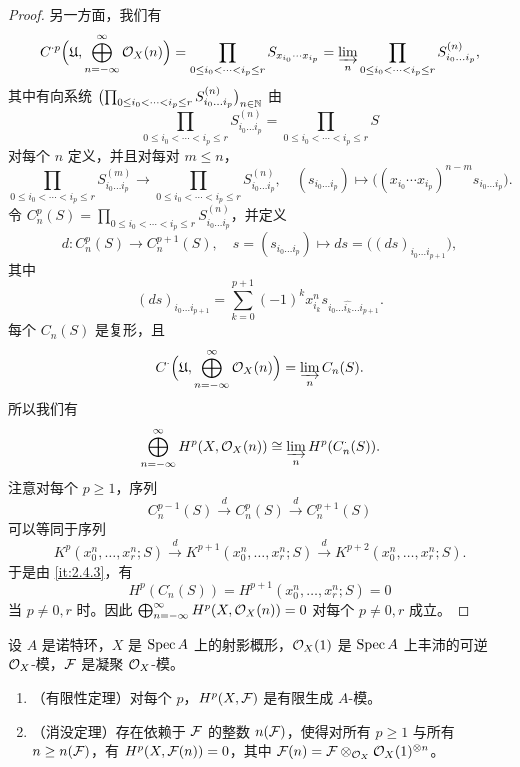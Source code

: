 \begin{proof}
另一方面，我们有
\[
C^{\cdot p}\Bigl(\mathfrak{U},\bigoplus_{n=-\infty}^{\infty}\mathcal{O}_X(n)\Bigr)
=\prod_{0\le i_0<\cdots<i_p\le r}S_{x_{i_0}\cdots x_{i_p}}
=\varinjlim_n\prod_{0\le i_0<\cdots<i_p\le r}S^{(n)}_{i_0\dots i_p},
\]
其中有向系统 $\bigl(\prod_{0\le i_0<\cdots<i_p\le r}S^{(n)}_{i_0\dots i_p}\bigr)_{n\in\mathbb{N}}$ 由
\[
\prod_{0\le i_0<\cdots<i_p\le r}S^{(n)}_{i_0\dots i_p}
=\prod_{0\le i_0<\cdots<i_p\le r}S
\]
对每个 $n$ 定义，并且对每对 $m\le n$，
\[
\prod_{0\le i_0<\cdots<i_p\le r}S^{(m)}_{i_0\dots i_p}
\to\prod_{0\le i_0<\cdots<i_p\le r}S^{(n)}_{i_0\dots i_p},\quad
(s_{i_0\dots i_p})\mapsto\bigl((x_{i_0}\cdots x_{i_p})^{n-m}s_{i_0\dots i_p}\bigr).
\]
令 $C^p_n(S)=\prod_{0\le i_0<\cdots<i_p\le r}S^{(n)}_{i_0\dots i_p}$，并定义
\[
d\colon C^p_n(S)\to C^{p+1}_n(S),\quad s=(s_{i_0\dots i_p})\mapsto ds=\bigl((ds)_{i_0\dots i_{p+1}}\bigr),
\]
其中
\[
(ds)_{i_0\dots i_{p+1}}=\sum_{k=0}^{p+1}(-1)^kx_{i_k}^ns_{i_0\dots\hat{i_k}\dots i_{p+1}}.
\]
每个 $C_n(S)$ 是复形，且
\[
C^{\cdot}\Bigl(\mathfrak{U},\bigoplus_{n=-\infty}^{\infty}\mathcal{O}_X(n)\Bigr)=\varinjlim_n C_n(S).
\]
所以我们有
\[
\bigoplus_{n=-\infty}^{\infty}H^p(X,\mathcal{O}_X(n))\cong\varinjlim_n H^p(C_n^{\cdot}(S)).
\]
注意对每个 $p\ge 1$，序列
\[
C_n^{p-1}(S)\xrightarrow{\;d\;}C_n^p(S)\xrightarrow{\;d\;}C_n^{p+1}(S)
\]
可以等同于序列
\[
K^p(x_0^n,\dots,x_r^n;S)\xrightarrow{\;d\;}K^{p+1}(x_0^n,\dots,x_r^n;S)
\xrightarrow{\;d\;}K^{p+2}(x_0^n,\dots,x_r^n;S).
\]
于是由 \ref{it:2.4.3}，有
\[
H^p(C_n^{\cdot}(S))=H^{p+1}(x_0^n,\dots,x_r^n;S)=0
\]
当 $p\ne 0,r$ 时。因此 $\bigoplus_{n=-\infty}^{\infty}H^p(X,\mathcal{O}_X(n))=0$ 对每个 $p\ne 0,r$ 成立。
\end{proof}

\begin{theorem}[Serre]\label{it:2.4.12}
设 $A$ 是诺特环，$X$ 是 $\operatorname{Spec} A$ 上的射影概形，$\mathcal{O}_X(1)$ 是 $\operatorname{Spec} A$ 上丰沛的可逆 $\mathcal{O}_X$-模，$\mathcal{F}$ 是凝聚 $\mathcal{O}_X$-模。
\begin{enumerate}[label=(\roman*),leftmargin=2.2em]
  \item （有限性定理）对每个 $p$，$H^p(X,\mathcal{F})$ 是有限生成 $A$-模。
  \item （消没定理）存在依赖于 $\mathcal{F}$ 的整数 $n(\mathcal{F})$，使得对所有 $p\ge 1$ 与所有 $n\ge n(\mathcal{F})$，有 $H^p(X,\mathcal{F}(n))=0$，其中 $\mathcal{F}(n)=\mathcal{F}\otimes_{\mathcal{O}_X}\mathcal{O}_X(1)^{\otimes n}$。
\end{enumerate}
\end{theorem}

